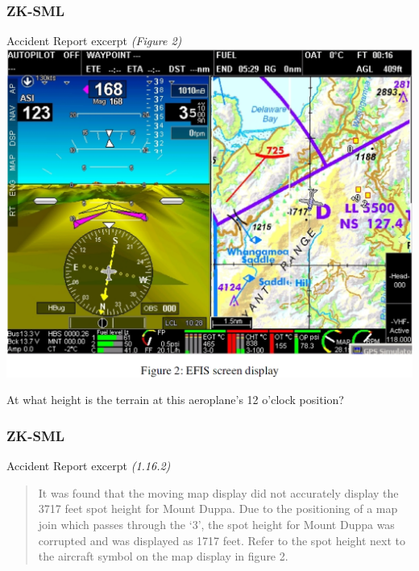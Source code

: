 \begin{frame}
\frametitle{ZK-SML}
\begin{block}{Accident Report excerpt \tiny{\emph{(Figure 2)}}}
\includegraphics[height=0.7\textheight]{image/zk-sml-map.png}
\end{block}
\tiny{At what height is the terrain at this aeroplane's 12 o'clock position?}
\end{frame}

\begin{frame}
\frametitle{ZK-SML}
\begin{block}{Accident Report excerpt \tiny{\emph{(1.16.2)}}}
\begin{quote}
It was found that the moving map display did not accurately display the 3717 feet spot height for Mount Duppa.  Due to the positioning of a map join which passes through the `3', the spot height for Mount Duppa was corrupted and was displayed as 1717 feet.  Refer to the spot height next to the aircraft symbol on the map display in figure 2. 
\end{quote}
\end{block}
\end{frame}
